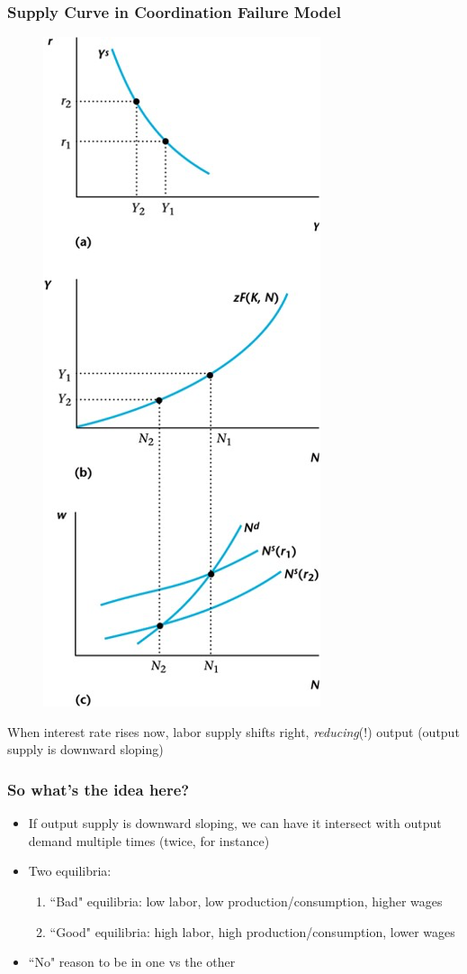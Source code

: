 \documentclass{beamer}
\begin{document}
\begin{frame}
\frametitle[alignment=center]{Supply Curve in Coordination Failure Model}
\begin{figure}
\centering
\includegraphics[scale=0.55]{Figures/W_Fig_13pt8.png}
\end{figure}
When interest rate rises now, labor supply shifts right, \emph{reducing}(!) output (output supply is downward sloping)
\end{frame}

\begin{frame}
\frametitle[alignment=center]{So what's the idea here?}
\begin{itemize}
\item If output supply is downward sloping, we can have it intersect with output demand multiple times (twice, for instance)
\bigskip
\item Two equilibria: 
\begin{enumerate}
\item ``Bad" equilibria: low labor, low production/consumption, higher wages
\bigskip
\item ``Good" equilibria: high labor, high production/consumption, lower wages
\end{enumerate}
\item ``No" reason to be in one vs the other
\end{itemize}
\end{frame}
\end{document}
